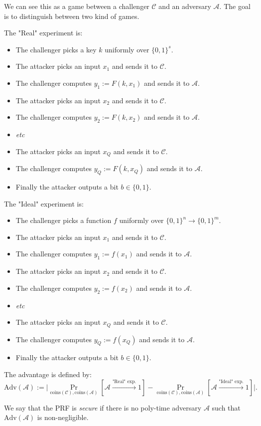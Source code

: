 \documentclass[./main]{subfiles}
\begin{document}
  \begin{rmk}
    We can see this as a game between a challenger $\mathcal{C}$ and an adversary $\mathcal{A}$.
    The goal is to distinguish between two kind of games.

    The "Real" experiment is:
    \begin{itemize}
      \item The challenger picks a key $k$ uniformly over $\{0,1\}^s$.
      \item The attacker picks an input $x_1$ and sends it to $\mathcal{C}$.
      \item The challenger computes  $y_1 := F(k, x_1)$ and sends it to $\mathcal{A}$.
      \item The attacker picks an input $x_2$ and sends it to $\mathcal{C}$.
      \item The challenger computes  $y_2 := F(k, x_2)$ and sends it to $\mathcal{A}$.
      \item \textit{etc}
      \item The attacker picks an input $x_Q$ and sends it to $\mathcal{C}$.
      \item The challenger computes  $y_Q := F(k, x_Q)$ and sends it to $\mathcal{A}$.
      \item Finally the attacker outputs a bit $b \in \{0,1\}$.
    \end{itemize}

    The "Ideal" experiment is:
    \begin{itemize}
      \item The challenger picks a function $f$ uniformly over $\{0,1\}^n \to \{0,1\}^m$.
      \item The attacker picks an input $x_1$ and sends it to $\mathcal{C}$.
      \item The challenger computes  $y_1 := f(x_1)$ and sends it to $\mathcal{A}$.
      \item The attacker picks an input $x_2$ and sends it to $\mathcal{C}$.
      \item The challenger computes  $y_2 := f(x_2)$ and sends it to $\mathcal{A}$.
      \item \textit{etc}
      \item The attacker picks an input $x_Q$ and sends it to $\mathcal{C}$.
      \item The challenger computes  $y_Q := f(x_Q)$ and sends it to $\mathcal{A}$.
      \item Finally the attacker outputs a bit $b \in \{0,1\}$.
    \end{itemize}

    The advantage is defined by:
    \[
      \mathrm{Adv}(\mathcal{A}) := \big| \Pr_{\mathrm{coins}(\mathcal{C}), \mathrm{coins}(\mathcal{A})}[\mathcal{A} \xrightarrow{\text{"Real" exp.}} 1] - \Pr_{\mathrm{coins}(\mathcal{C}), \mathrm{coins}(\mathcal{A})}[\mathcal{A} \xrightarrow{\text{"Ideal" exp.}} 1] \big|
    .\]

    We say that the PRF is \textit{secure} if there is no poly-time adversary $\mathcal{A}$ such that $\mathrm{Adv}(\mathcal{A})$ is non-negligible.
  \end{rmk}
\end{document}
